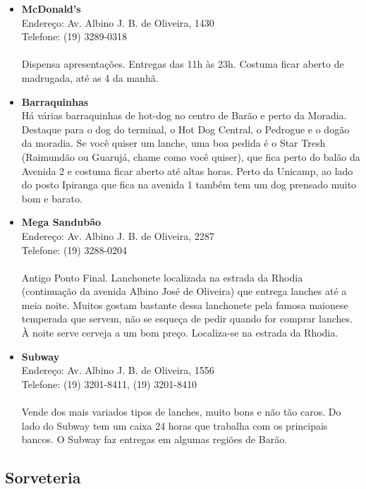 \begin{itemize}
\item \textbf{McDonald's}
  \\Endereço: Av. Albino J. B. de Oliveira, 1430
  \\Telefone: (19) 3289-0318
  \\
  \\Dispensa apresentações. Entregas das 11h às 23h. Costuma ficar aberto
  de madrugada, até as 4 da manhã.

\item \textbf{Barraquinhas}
  \\Há várias barraquinhas de hot-dog no centro de Barão e perto da Moradia.
  Destaque para o dog do terminal, o Hot Dog Central, o Pedrogue e o dogão da
  moradia. Se você quiser um lanche, uma boa pedida é o Star Tresh (Raimundão
  ou Guarujá, chame como você quiser), que fica perto do balão da Avenida 2 e
  costuma ficar aberto até altas horas. Perto da Unicamp, ao lado do posto
  Ipiranga que fica na avenida 1 também tem um dog prensado muito bom e barato.

\item \textbf{Mega Sandubão}
  \\Endereço: Av. Albino J. B. de Oliveira, 2287
  \\Telefone: (19) 3288-0204
  \\
  \\Antigo Ponto Final. Lanchonete localizada na estrada da Rhodia
  (continuação da avenida Albino José de Oliveira) que entrega lanches até
  a meia noite. Muitos gostam bastante dessa lanchonete pela famosa maionese
  temperada que servem, não se esqueça de pedir quando for comprar lanches. À
  noite serve cerveja a um bom preço. Localiza-se na estrada da Rhodia.

\item \textbf{Subway}
  \\Endereço: Av. Albino J. B. de Oliveira, 1556
  \\Telefone: (19) 3201-8411, (19) 3201-8410
  \\
  \\Vende dos mais variados tipos de lanches, muito bons e não tão caros. Do
  lado do Subway tem um caixa 24 horas que trabalha com os principais bancos.
  O Subway faz entregas em algumas regiões de Barão.
\end{itemize}

\subsection{Sorveteria}

